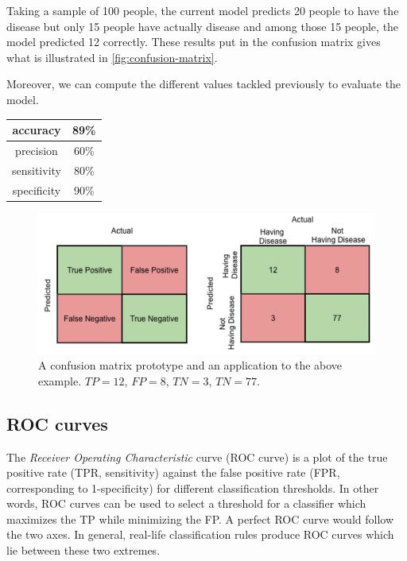 \documentclass[11pt, openany]{report}
\theoremstyle{plain}
\theoremstyle{definition}
\theoremstyle{remark}
\begin{document}
Taking a sample of 100 people, the current model predicts 20 people to have the disease but only 15 people have actually disease and among those 15 people, the model predicted 12 correctly. These results put in the confusion matrix gives what is illustrated in \autoref{fig:confusion-matrix}. 

Moreover, we can compute the different values tackled previously to evaluate the model. 

\begin{center}
    \begin{tabular}{|c|c|}
      \hline 
      accuracy & 89\% \\
      \hline
      precision & 60\% \\
      \hline
      sensitivity & 80\% \\
      \hline
      specificity &  90\% \\
      \hline
    \end{tabular}
\end{center}

\begin{figure}[h]
  \centering
  \includegraphics[scale=0.4]{figures/confusion-matrix.png}
  \caption{A confusion matrix prototype and an application to the above example. $TP = 12$, $FP = 8$, $TN = 3$, $TN = 77$.}
  \label{fig:confusion-matrix}
\end{figure}


\subsection{ROC curves}
The \textit{Receiver Operating Characteristic} curve (ROC curve) is a plot of the true positive rate (TPR, sensitivity) against the false positive rate (FPR, corresponding to 1-specificity) for different classification thresholds. In other words, ROC curves can be used to select a threshold for a classifier which maximizes the TP while minimizing the FP. A perfect ROC curve would follow the two axes. In general, real-life classification rules produce ROC curves which lie between these two extremes. 
\end{document}
